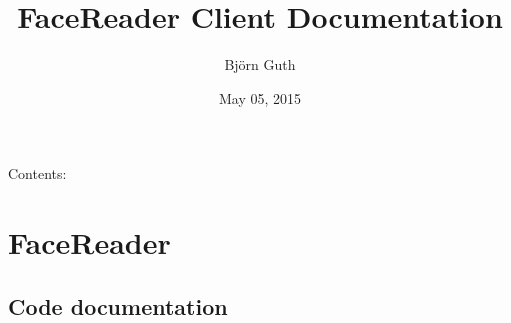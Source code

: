 \documentclass[letterpaper,10pt,english]{sphinxmanual}
\title{FaceReader Client Documentation}
\date{May 05, 2015}
\author{Björn Guth}
\begin{document}
\maketitle
\tableofcontents
{}\label{index::doc}


Contents:


\chapter{FaceReader}
\label{_static/code::doc}\label{_static/code:welcome-to-facereader-client-s-documentation}\label{_static/code:facereader}

\section{Code documentation}
\label{_static/code:code-documentation}
\end{document}
